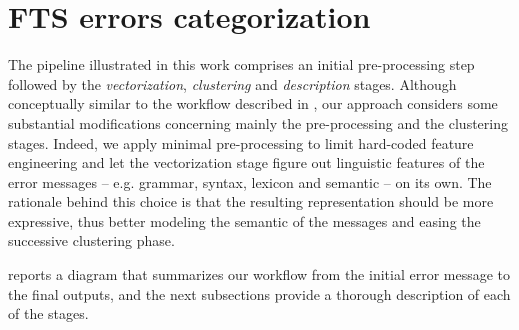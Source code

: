 \section{FTS errors categorization} \label{sec:pipeline}

The pipeline illustrated in this work comprises an initial pre-processing step followed by the \textit{vectorization}, \textit{clustering} and \textit{description} stages.
Although conceptually similar to the workflow described in , our approach considers some substantial modifications concerning mainly the pre-processing and the clustering stages.
Indeed, we apply minimal pre-processing to limit hard-coded feature engineering and let the vectorization stage figure out linguistic features of the error messages -- e.g. grammar, syntax, lexicon and semantic -- on its own.
The rationale behind this choice is that the resulting representation should be more expressive, thus better modeling the semantic of the messages and easing the successive clustering phase.

 reports a diagram that summarizes our workflow from the initial error message to the final outputs, and the next subsections provide a thorough description of each of the stages.


